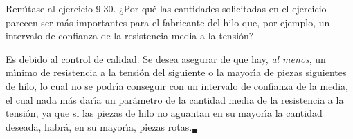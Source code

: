 \begin{enunciado}
 Rem\'{\i}tase al ejercicio 9.30. ¿Por qu\'e las cantidades solicitadas en el ejercicio parecen ser m\'as importantes para el fabricante del hilo que, por ejemplo, un intervalo de confianza de la resistencia media a la tensi\'on?
\end{enunciado}

\begin{solucion}
 Es debido al control de calidad. Se desea asegurar de que hay, \textit{al menos}, un m\'{\i}nimo de resistencia a la tensi\'on del siguiente o la mayor\'{\i}a de piezas siguientes de hilo, lo cual no se podr\'{\i}a conseguir con un intervalo de confianza de la media, el cual nada m\'as dar\'{\i}a un par\'ametro de la cantidad media de la resistencia a la tensi\'on, ya que si las piezas de hilo no aguantan en su mayor\'{\i}a la cantidad deseada, habr\'a, en su mayor\'{\i}a, piezas rotas.${}_{\blacksquare}$
\end{solucion}
